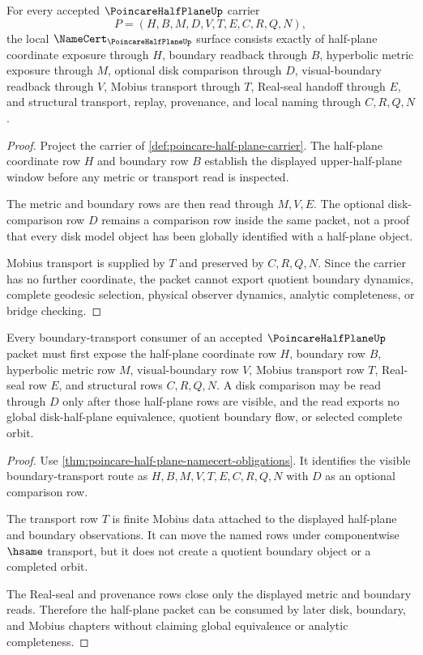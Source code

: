 \begin{theorem}
\label{thm:poincare-half-plane-namecert-obligations}
For every accepted $\PoincareHalfPlaneUp$ carrier
$$
P=(H,B,M,D,V,T,E,C,R,Q,N),
$$
the local $\NameCert_{\PoincareHalfPlaneUp}$ surface consists exactly of half-plane coordinate exposure through $H$, boundary readback through $B$, hyperbolic metric exposure through $M$, optional disk comparison through $D$, visual-boundary readback through $V$, Mobius transport through $T$, Real-seal handoff through $E$, and structural transport, replay, provenance, and local naming through $C,R,Q,N$.
\end{theorem}
\begin{proof}
Project the carrier of \autoref{def:poincare-half-plane-carrier}. The half-plane coordinate row $H$ and boundary row $B$ establish the displayed upper-half-plane window before any metric or transport read is inspected.

The metric and boundary rows are then read through $M,V,E$. The optional disk-comparison row $D$ remains a comparison row inside the same packet, not a proof that every disk model object has been globally identified with a half-plane object.

Mobius transport is supplied by $T$ and preserved by $C,R,Q,N$. Since the carrier has no further coordinate, the packet cannot export quotient boundary dynamics, complete geodesic selection, physical observer dynamics, analytic completeness, or bridge checking.
\end{proof}

\begin{theorem}
\label{thm:poincare-half-plane-boundary-transport}
Every boundary-transport consumer of an accepted $\PoincareHalfPlaneUp$ packet must first expose the half-plane coordinate row $H$, boundary row $B$, hyperbolic metric row $M$, visual-boundary row $V$, Mobius transport row $T$, Real-seal row $E$, and structural rows $C,R,Q,N$. A disk comparison may be read through $D$ only after those half-plane rows are visible, and the read exports no global disk-half-plane equivalence, quotient boundary flow, or selected complete orbit.
\end{theorem}
\begin{proof}
Use \autoref{thm:poincare-half-plane-namecert-obligations}. It identifies the visible boundary-transport route as $H,B,M,V,T,E,C,R,Q,N$ with $D$ as an optional comparison row.

The transport row $T$ is finite Mobius data attached to the displayed half-plane and boundary observations. It can move the named rows under componentwise $\hsame$ transport, but it does not create a quotient boundary object or a completed orbit.

The Real-seal and provenance rows close only the displayed metric and boundary reads. Therefore the half-plane packet can be consumed by later disk, boundary, and Mobius chapters without claiming global equivalence or analytic completeness.
\end{proof}

